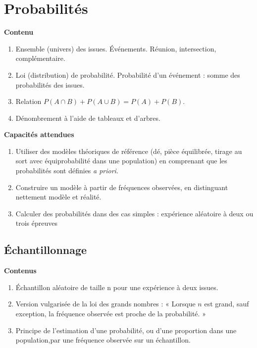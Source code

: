 \documentclass[10pt,a4paper]{article}
\begin{document}
 

\section{Probabilités}

\textbf{Contenu}

\begin{enumerate}
\item  Ensemble (univers) des issues. Événements. Réunion, intersection, complémentaire.
\item  Loi (distribution) de probabilité. Probabilité d’un événement : somme des probabilités 
des issues.
\item   Relation $P(A \cap B) + P(A \cup B) = P(A) + P(B)$.
\item  Dénombrement à l'aide de tableaux et d'arbres.
\end{enumerate}


\textbf{Capacités attendues}
 
\begin{enumerate}
\item Utiliser des modèles théoriques de référence (dé, pièce équilibrée, tirage au sort avec équiprobabilité dans une population) en comprenant que les probabilités sont définies \textit{a priori}.
\item Construire un modèle à partir de fréquences observées, en distinguant nettement modèle et réalité.
\item  Calculer des probabilités dans des cas simples : expérience aléatoire à deux ou trois épreuves

\end{enumerate}
 
 

  
\subsection*{Échantillonnage}

\textbf{Contenus} 
 
\begin{enumerate} 
\item Échantillon aléatoire de taille n pour une expérience à deux issues.
\item Version vulgarisée de la loi des grands nombres : « Lorsque $n$ est grand, sauf exception, la fréquence observée est proche de la probabilité. »
\item Principe de l'estimation d'une probabilité, ou d'une proportion dans une population,par une fréquence observée sur un échantillon.
\end{enumerate}
\end{document}
